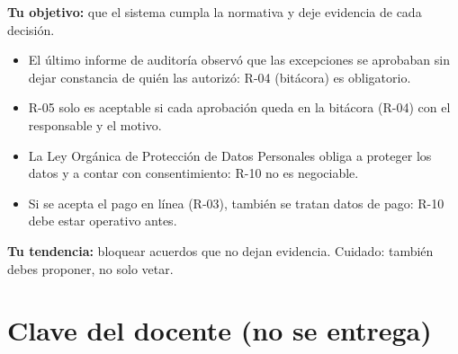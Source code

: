 \documentclass[11pt]{article}
\newcommand{\seccion}[1]{\section{\textcolor{utegreendk}{#1}}}
\begin{document}
\begin{tarjeta}[title={ROL 4 \,$\cdot$\, AUDITOR (control interno y protección de datos)}]
	\textbf{Tu objetivo:} que el sistema cumpla la normativa y deje evidencia de cada decisión.
	\begin{itemize}[leftmargin=14pt,itemsep=1pt,topsep=2pt]
		\item El último informe de auditoría observó que las excepciones se aprobaban sin dejar constancia de quién las autorizó: R-04 (bitácora) es obligatorio.
		\item R-05 solo es aceptable si cada aprobación queda en la bitácora (R-04) con el responsable y el motivo.
		\item La Ley Orgánica de Protección de Datos Personales obliga a proteger los datos y a contar con consentimiento: R-10 no es negociable.
		\item Si se acepta el pago en línea (R-03), también se tratan datos de pago: R-10 debe estar operativo antes.
	\end{itemize}
	\textbf{Tu tendencia:} bloquear acuerdos que no dejan evidencia. Cuidado: también debes proponer, no solo vetar.
\end{tarjeta}

\newpage
\seccion{Clave del docente (no se entrega)}
\end{document}
